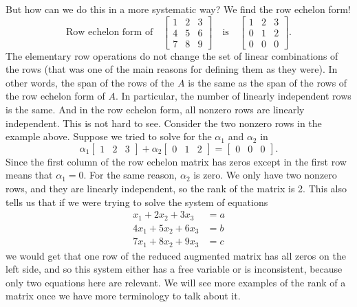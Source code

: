 \documentclass{ximera}
\begin{document}
But how can we do this in a more systematic way?  We find the row echelon form!
\begin{equation*}
    \text{Row echelon form of} \quad
    \begin{bmatrix}
        1 & 2 & 3 \\
        4 & 5 & 6  \\
        7 & 8 & 9
    \end{bmatrix}
    \quad \text{is} \quad 
    \begin{bmatrix}
        1 & 2 & 3 \\
        0 & 1 & 2  \\
        0 & 0 & 0
    \end{bmatrix} .
\end{equation*}
The elementary row operations do not change the set of linear combinations of the rows (that was one of the main reasons for defining them as they were). In other words, the span of the rows of the $A$ is the same as the span of the rows of the row echelon form of $A$. In particular, the number of linearly independent rows is the same. And in the row echelon form, all nonzero rows are linearly independent. This is not hard to see. Consider the two nonzero rows in the example above. Suppose we  tried to solve for the $\alpha_1$ and $\alpha_2$ in
\begin{equation*}
    \alpha_1
    \begin{bmatrix}
        1 & 2 & 3
    \end{bmatrix} 
    + \alpha_2
    \begin{bmatrix}
        0 & 1 & 2 
    \end{bmatrix} =
    \begin{bmatrix}
        0 & 0 & 0
    \end{bmatrix} .
\end{equation*}
Since the first column of the row echelon matrix has zeros except in the first row means that $\alpha_1 = 0$.  For the same reason, $\alpha_2$ is zero. We only have two nonzero rows, and they are linearly independent, so the rank of the matrix is 2. This also tells us that if we were trying to solve the system of equations
\begin{equation*}
    \begin{split}
        x_1 + 2x_2 + 3x_3 &= a \\
        4x_1 + 5x_2 + 6x_3 &= b \\
        7x_1 + 8x_2 + 9x_3 &= c
    \end{split}
\end{equation*}
we would get that one row of the reduced augmented matrix has all zeros on the left side, and so this system either has a free variable or is inconsistent, because only two equations here are relevant. We will see more examples of the rank of a matrix once we have more terminology to talk about it.
\end{document}
